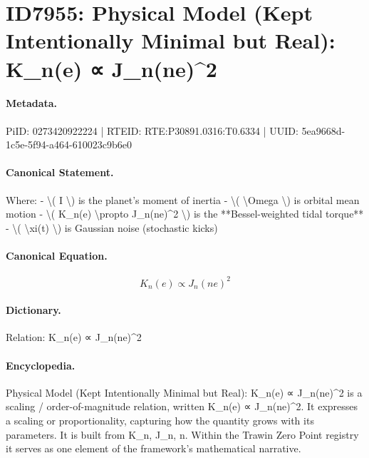 \section*{ID7955: Physical Model (Kept Intentionally Minimal but Real): K\_n(e) ∝ J\_n(ne)\textasciicircum{}2}
\paragraph{Metadata.}
PiID: 0273420922224 | RTEID: RTE:P30891.0316:T0.6334 | UUID: 5ea9668d-1c5e-5f94-a464-610023c9b6e0

\paragraph{Canonical Statement.}
Where: - \textbackslash{}( I \textbackslash{}) is the planet’s moment of inertia - \textbackslash{}( \textbackslash{}Omega \textbackslash{}) is orbital mean motion - \textbackslash{}( K\_n(e) \textbackslash{}propto J\_n(ne)\textasciicircum{}2 \textbackslash{}) is the **Bessel-weighted tidal torque** - \textbackslash{}( \textbackslash{}xi(t) \textbackslash{}) is Gaussian noise (stochastic kicks)

\paragraph{Canonical Equation.}
\[
K_n(e) \propto J_n(ne)^2
\]

\paragraph{Dictionary.}
Relation: K\_n(e) ∝ J\_n(ne)\textasciicircum{}2

\paragraph{Encyclopedia.}
Physical Model (Kept Intentionally Minimal but Real): K\_n(e) ∝ J\_n(ne)\textasciicircum{}2 is a scaling / order-of-magnitude relation, written K\_n(e) ∝ J\_n(ne)\textasciicircum{}2. It expresses a scaling or proportionality, capturing how the quantity grows with its parameters. It is built from K\_n, J\_n, n. Within the Trawin Zero Point registry it serves as one element of the framework's mathematical narrative.
